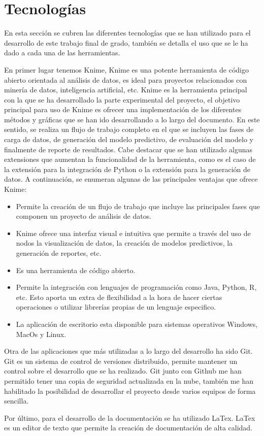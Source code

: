 \section{Tecnologías}

En esta sección se cubren las diferentes tecnologías que se han utilizado para el desarrollo de este trabajo final de grado, también se detalla el uso que se  le ha dado a cada una de las herramientas. 

\bigbreak

En primer lugar tenemos Knime, Knime es una potente herramienta de código abierto orientada al análisis de datos, es ideal para proyectos relacionados con minería de datos, inteligencia artificial, etc. Knime es la herramienta principal con la que se ha desarrollado la parte experimental del proyecto, el objetivo principal para uso de Knime es ofrecer una implementación de los diferentes métodos y gráficas que se han ido desarrollando a lo largo del documento. En este sentido, se realiza un flujo de trabajo completo en el que se incluyen las fases de carga de datos, de generación del modelo predictivo, de evaluación del modelo y finalmente de reporte de resultados. Cabe destacar que se han utilizado algunas extensiones que aumentan la funcionalidad de la herramienta, como es el caso de la extensión para la integración de Python o la extensión para la generación de datos. A continuación, se enumeran algunas de las principales ventajas que ofrece Knime:

\begin{itemize}
    \item Permite la creación de un flujo de trabajo que incluye las principales fases que componen un proyecto de análisis de datos. 
    \item Knime ofrece una interfaz visual e intuitiva que permite a través del uso de nodos la visualización de datos, la creación de modelos predictivos, la generación de reportes, etc.
    \item Es una herramienta de código abierto.
    \item Permite la integración con lenguajes de programación como Java, Python, R, etc. Esto aporta un extra de flexibilidad a la hora de hacer ciertas operaciones o utilizar librerías propias de un lenguaje especifico.
    \item La aplicación de escritorio esta disponible para sistemas operativos Windows, MacOs y Linux.
\end{itemize}

\bigbreak

Otra de las aplicaciones que más utilizadas a lo largo del desarrollo ha sido Git. Git es un sistema de control de versiones distribuido, permite mantener un control sobre el desarrollo que se ha realizado. Git junto con Github me han permitido tener una copia de seguridad actualizada en la nube, también me han habilitado la posibilidad de desarrollar el proyecto desde varios equipos de forma sencilla.

\bigbreak

Por último, para el desarrollo de la documentación se ha utilizado LaTex. LaTex es un editor de texto que permite la creación de documentación de alta calidad.

\clearpage